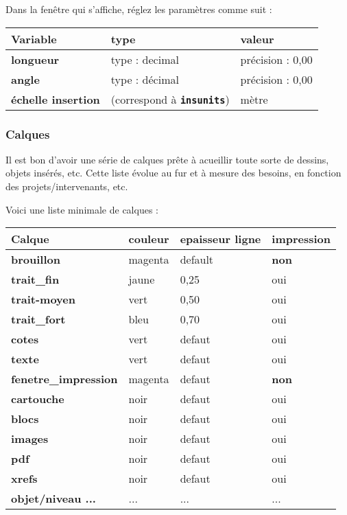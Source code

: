 \documentclass[a4paper,12pt,french]{sphinxmanual}
\begin{document}
Dans la fenêtre qui s'affiche, réglez les paramètres comme suit :

\noindent\begin{tabulary}{\linewidth}{|L|L|L|}
\hline

\textbf{Variable}
&
\textbf{type}
&
\textbf{valeur}
\\
\hline
\textbf{longueur}
&
type : decimal
&
précision : 0,00
\\
\hline
\textbf{angle}
&
type : décimal
&
précision : 0,00
\\
\hline
\textbf{échelle insertion}
&
(correspond à \textbf{\texttt{insunits}})
&
mètre
\\
\hline\end{tabulary}



\subsubsection{Calques}
\label{acad/config_acad:calques}
Il est bon d'avoir une série de calques prête à acueillir toute sorte de dessins, objets insérés, etc. Cette liste évolue au fur et à mesure des besoins, en fonction des projets/intervenants, etc.

Voici une liste minimale de calques :

\noindent\begin{tabulary}{\linewidth}{|L|L|L|L|}
\hline

\textbf{Calque}
&
\textbf{couleur}
&
\textbf{epaisseur ligne}
&
\textbf{impression}
\\
\hline
\textbf{brouillon}
&
magenta
&
default
&
\textbf{non}
\\
\hline
\textbf{trait\_fin}
&
jaune
&
0,25
&
oui
\\
\hline
\textbf{trait-moyen}
&
vert
&
0,50
&
oui
\\
\hline
\textbf{trait\_fort}
&
bleu
&
0,70
&
oui
\\
\hline
\textbf{cotes}
&
vert
&
defaut
&
oui
\\
\hline
\textbf{texte}
&
vert
&
defaut
&
oui
\\
\hline
\textbf{fenetre\_impression}
&
magenta
&
defaut
&
\textbf{non}
\\
\hline
\textbf{cartouche}
&
noir
&
defaut
&
oui
\\
\hline
\textbf{blocs}
&
noir
&
defaut
&
oui
\\
\hline
\textbf{images}
&
noir
&
defaut
&
oui
\\
\hline
\textbf{pdf}
&
noir
&
defaut
&
oui
\\
\hline
\textbf{xrefs}
&
noir
&
defaut
&
oui
\\
\hline
\textbf{objet/niveau ...}
&
...
&
...
&
...
\\
\hline\end{tabulary}
\end{document}

